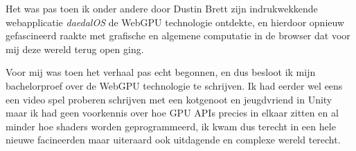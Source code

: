 \bigbreak{}

Het was pas toen ik onder andere door Dustin Brett zijn indrukwekkende webapplicatie \textit{daedalOS} de WebGPU technologie ontdekte, en hierdoor opnieuw gefascineerd raakte met grafische en algemene computatie in de browser dat voor mij deze wereld terug open ging.

\bigbreak{}

Voor mij was toen het verhaal pas echt begonnen, en dus besloot ik mijn bachelorproef over de WebGPU technologie te schrijven. Ik had eerder wel eens een video spel proberen schrijven met een kotgenoot en jeugdvriend in Unity maar ik had geen voorkennis over hoe GPU APIs precies in elkaar zitten en al minder hoe shaders worden geprogrammeerd, ik kwam dus terecht in een hele
nieuwe facineerden maar uiteraard ook uitdagende en complexe wereld terecht.